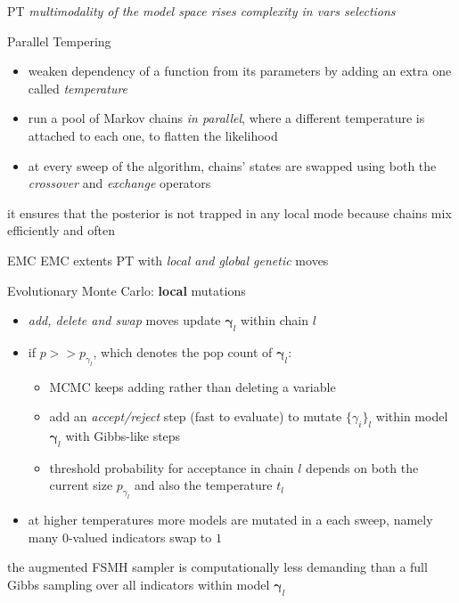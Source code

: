\documentclass{beamer}
\newcommand{\vect}[1]{\boldsymbol{#1}}
\begin{document}
\begin{frame}{PT}
\emph{multimodality of the model space rises complexity in vars selections}
\begin{block}{Parallel Tempering}
    \begin{itemize}
        \item weaken dependency of a function from its parameters by adding an
        extra one called \emph{temperature}
        \item run a pool of Markov chains \emph{in parallel}, where a different
        temperature is attached to each one, to flatten the likelihood
        \item at every sweep of the algorithm, chains' states are swapped using
        both the \emph{crossover} and \emph{exchange} operators
    \end{itemize}
    it ensures that the posterior is not trapped in any local mode because 
    chains mix efficiently and often
\end{block}
\end{frame}

\begin{frame}{EMC}
EMC extents PT with \emph{local and global genetic} moves
\begin{block}{Evolutionary Monte Carlo: \textbf{local} mutations}
    \begin{itemize}
        \item \emph{add, delete and swap}  moves update
        $\vect{\gamma}_{l}$ within chain $l$
        \item if $p >> p_{\gamma_{l}}$, which denotes the pop count of $\vect{\gamma}_{l}$:
            \begin{itemize}
                \item MCMC keeps adding rather than deleting a variable
                \item add an \emph{accept/reject} step (fast to evaluate) to
                mutate $ \lbrace \gamma_{i} \rbrace_{l}$ within model
                $\vect{\gamma}_{l}$ with Gibbs-like steps
                \item threshold probability for acceptance in chain $l$ depends on both the 
                current size $p_{\gamma_{l}}$ and also the temperature $t_{l}$
            \end{itemize}
        \item at higher temperatures more models are mutated in a each sweep,
        namely many $0$-valued indicators swap to $1$
    \end{itemize}
    the augmented FSMH sampler is computationally less demanding than a full Gibbs sampling 
    over all indicators within model $\vect{\gamma}_{l}$
    \end{block}
\end{frame}
\end{document}
